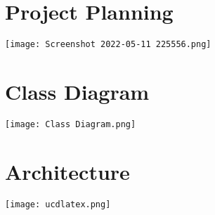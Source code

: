 \documentclass[pdftex,a4paper,11pt,oneside,openright]{report}
\begin{document}
\chapter{Project Planning}
\centering
\texttt{[image: Screenshot 2022-05-11 225556.png]}

\chapter{Class Diagram}
\centering
\texttt{[image: Class Diagram.png]}

\chapter{Architecture}
\texttt{[image: ucdlatex.png]}

\end{document}
